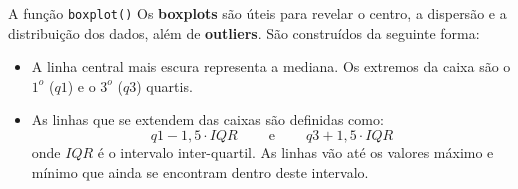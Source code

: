\documentclass[10pt]{beamer}\usepackage[]{graphicx}\usepackage[]{color}
\makeatletter
\newcommand{\hlcom}[1]{\textcolor[rgb]{0.498,0.498,0.498}{\textit{#1}}}%
\newcommand{\hlopt}[1]{\textcolor[rgb]{0,0,0}{#1}}%
\newcommand{\hlstd}[1]{\textcolor[rgb]{0.345,0.345,0.345}{#1}}%
\newcommand{\hlkwd}[1]{\textcolor[rgb]{0.282,0.239,0.545}{\textbf{#1}}}%
\newenvironment{kframe}{%
 \def\at@end@of@kframe{}%
 \ifinner\ifhmode%
  \def\at@end@of@kframe{\end{minipage}}%
  \begin{minipage}{\columnwidth}%
 \fi\fi%
 \def\FrameCommand##1{\hskip\@totalleftmargin \hskip-\fboxsep
 \colorbox{shadecolor}{##1}\hskip-\fboxsep
     \hskip-\linewidth \hskip-\@totalleftmargin \hskip\columnwidth}%
 \MakeFramed {\advance\hsize-\width
   \@totalleftmargin\z@ \linewidth\hsize
   \@setminipage}}%
 {\par\unskip\endMakeFramed%
 \at@end@of@kframe}
\newenvironment{knitrout}{}{} %
\makeatother
\begin{document}

\begin{frame}[fragile=singleslide]{A função \texttt{boxplot()}}
Os \textbf{boxplots} são úteis para revelar o centro, a dispersão e a
distribuição dos dados, além de \textbf{outliers}. São construídos da
seguinte forma:
\begin{itemize}
\item A linha central mais escura representa a mediana. Os extremos da
  caixa são o $1^{o}$ ($q1$) e o $3^{o}$ ($q3$) quartis.
\item As linhas que se extendem das caixas são definidas como:
\begin{displaymath}
q1-1,5\cdot IQR\ \qquad \mathrm{e}\ \qquad q3+1,5\cdot IQR
\end{displaymath}
onde $IQR$ é o intervalo inter-quartil. As linhas vão até os valores
máximo e mínimo que ainda se encontram dentro deste intervalo.
\end{itemize}
\end{frame}
\end{document}
